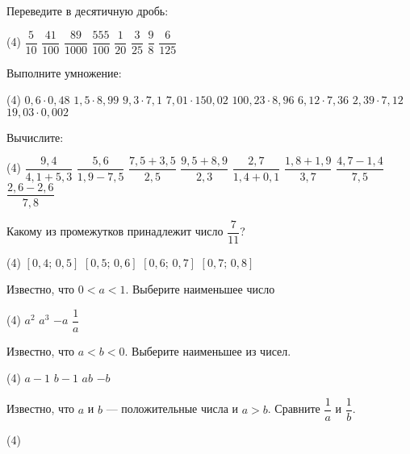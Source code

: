 \begin{class}[number=3]
	\begin{listofex}
		\item Переведите в десятичную дробь:
		\begin{tasks}(4)
			\task \( \dfrac{5}{10} \)
			\task \( \dfrac{41}{100} \)
			\task \( \dfrac{89}{1000} \)
			\task \( \dfrac{555}{100} \)
			\task \( \dfrac{1}{20} \)
			\task \( \dfrac{3}{25} \)
			\task \( \dfrac{9}{8} \)
			\task \( \dfrac{6}{125} \)
		\end{tasks}
		\item Выполните умножение:
		\begin{tasks}(4)
			\task \( 0,6\cdot0,48 \)
			\task \( 1,5\cdot8,99 \)
			\task \( 9,3\cdot7,1 \)
			\task \( 7,01\cdot150,02 \)
			\task \( 100,23\cdot8,96 \)
			\task \( 6,12\cdot7,36 \)
			\task \( 2,39\cdot7,12 \)
			\task \( 19,03\cdot0,002 \)
		\end{tasks}
		\item Вычислите:
		\begin{tasks}(4)
			\task \( \dfrac{9,4}{4,1+5,3} \)
			\task \( \dfrac{5,6}{1,9-7,5} \)
			\task \( \dfrac{7,5+3,5}{2,5} \)
			\task \( \dfrac{9,5+8,9}{2,3} \)
			\task \( \dfrac{2,7}{1,4+0,1} \)
			\task \( \dfrac{1,8+1,9}{3,7} \)
			\task \( \dfrac{4,7-1,4}{7,5} \)
			\task \( \dfrac{2,6-2,6}{7,8} \)
		\end{tasks}
		\item Какому из промежутков принадлежит число \( \dfrac{7}{11} \)?
		\begin{tasks}(4)
			\task \( [0,4; \, 0,5] \)
			\task \( [0,5; \, 0,6] \)
			\task \( [0,6; \, 0,7] \)
			\task \( [0,7; \, 0,8] \)
		\end{tasks}
		\item Известно, что \( 0<a<1 \). Выберите наименьшее число
		\begin{tasks}(4)
			\task \( a^2 \)
			\task \( a^3 \)
			\task \( -a \)
			\task \( \dfrac{1}{a} \)
		\end{tasks}
		\item Известно, что \( a<b<0 \). Выберите наименьшее из чисел.
		\begin{tasks}(4)
			\task \( a-1 \)
			\task \( b-1 \)
			\task \( ab \)
			\task \( -b \)
		\end{tasks}
		\item Известно, что \( a \) и \( b \) --- положительные числа и \( a>b \). Сравните \( \dfrac{1}{a} \) и \( \dfrac{1}{b} \).
		\begin{tasks}(4)

\end{tasks}
\end{listofex}
\end{class}
